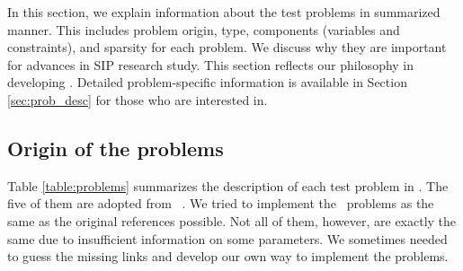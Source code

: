 In this section, we explain information about the test problems in summarized manner. This includes problem origin, type, components (variables and constraints), and sparsity for each problem. We discuss why they are important for advances in SIP research study. This section reflects our philosophy in developing \siplibtwo. Detailed problem-specific information is available in Section \ref{sec:prob_desc} for those who are interested in.

\subsection{Origin of the problems}
Table \ref{table:problems} summarizes the description of each test problem in \siplibtwo. The five of them are adopted from \siplib\ \cite{web:SIPLIB1}. We tried to implement the \siplib\ problems as the same as the original references possible. Not all of them, however, are exactly the same due to insufficient information on some parameters. We sometimes needed to guess the missing links and develop our own way to implement the problems. 
